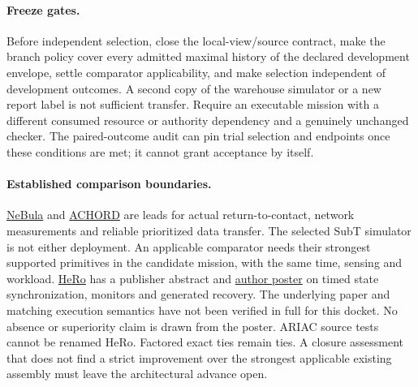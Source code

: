 \documentclass[11pt]{article}
\begin{document}
\paragraph{Freeze gates.}
Before independent selection, close the local-view/source contract,
make the branch policy cover every admitted maximal history of the
declared development envelope, settle comparator applicability, and
make selection independent of development outcomes. A second copy of
the warehouse simulator or a new report label is not sufficient
transfer. Require an executable mission with a different consumed
resource or authority dependency and a genuinely unchanged checker.
The paired-outcome audit can pin trial selection and endpoints once
these conditions are met; it cannot grant acceptance by itself.

\paragraph{Established comparison boundaries.}
\href{https://arxiv.org/abs/2103.11470}{NeBula} and
\href{https://arxiv.org/abs/2206.02245}{ACHORD} are leads for actual
return-to-contact, network measurements and reliable prioritized data
transfer. The selected SubT simulator is not either deployment. An
applicable comparator needs their strongest supported primitives in
the candidate mission, with the same time, sensing and workload.
\href{https://doi.org/10.1109/ICRA55743.2025.11128674}{HeRo}
has a publisher abstract and
\href{https://is.cas.cn/ztzl/rjsxsnh/2025xsnh/205hbzs/202607/P020260715632339212745.pdf}{author poster}
on timed state synchronization, monitors and generated recovery.
The underlying paper and matching execution semantics have not been
verified in full for this docket. No absence or superiority claim is
drawn from the poster. ARIAC source tests cannot be renamed HeRo.
Factored exact ties remain ties. A closure assessment that does not
find a strict improvement over the strongest applicable existing
assembly must leave the architectural advance open.
\end{document}
